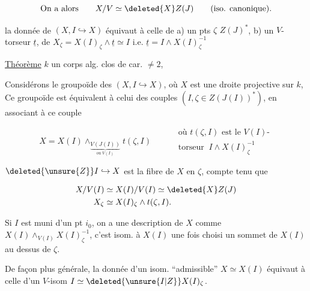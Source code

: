 \[
\text{On a alors}\qquad X/V\simeq\deleted{X}Z(J)\qquad\text{(iso. canonique).}
\]

  la donnée de $(X,I\hookrightarrow X)$ équivaut à celle de a) un pts $\zeta$  $Z(J)^*$, b) un $V$-torseur $\underline t$,    de  $X_\zeta=X(I)_\zeta\wedge\underline t\simeq I$ i.e. $\underline t=I\wedge X(I)_\zeta^{-1}$


\uline{Théorème}  $k$ un corps alg. clos de car. $\ne 2$,  

Considérons le groupoïde des $(X,I\hookrightarrow X)$, où $X$ est une droite projective sur $k$,   Ce groupoïde est équivalent à celui des couples $(I,\zeta\in Z(J(I))^*)$, en associant à ce couple

\[
X=X(I)\wedge_{\underset{\text{ou }V(I)}{\underbrace{V(J(I))}}}t(\zeta,I)
\qquad\begin{aligned}&\text{où }t(\zeta,I)\text{ est le }V(I)\text{-}\\[-2pt]&\text{torseur }\ I\wedge X(I)_\zeta^{-1}\end{aligned}
\]

$\deleted{\unsure{Z}}I\hookrightarrow X$ est la fibre  de $X$ en $\zeta$, compte tenu que

\[
\begin{aligned}
X/V(I)&\simeq X(I)/V(I)\simeq\deleted{X}Z(J)\\
X_\zeta&\simeq X(I)_\zeta\wedge t(\zeta,I).
\end{aligned}
\]

 Si $I$ est muni d'un pt $i_0$, on a une description de $X$ comme $X(I)\wedge_{V(I)}X(I)_\zeta^{-1}$, c'est isom. à $X(I)$ une fois choisi un sommet de $X(I)$ au dessus de $\zeta$.

De façon plus générale,  la donnée d'un isom. ``admissible'' $X\simeq X(I)$ équivaut à celle d'un $V$-isom $I\simeq\deleted{\unsure{I|Z}}X(I)_\zeta$.



